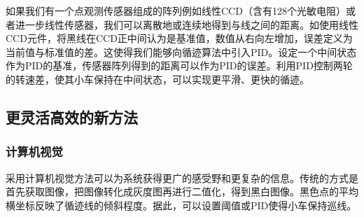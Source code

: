 \documentclass{report}
\begin{document}
如果我们有一个点观测传感器组成的阵列例如线性CCD（含有128个光敏电阻）或者进一步线性传感器，我们可以离散地或连续地得到与线之间的距离。如使用线性CCD元件\cite{CCD}，将黑线在CCD正中间认为是基准值，数值从右向左增加，误差定义为当前值与标准值的差。这使得我们能够向循迹算法中引入PID。设定一个中间状态作为PID的基准，传感器阵列得到的距离可以作为PID的误差。利用PID控制两轮的转速差，使其小车保持在中间状态，可以实现更平滑、更快的循迹。

\subsection{更灵活高效的新方法}
\label{subsec:label}
\subsubsection{计算机视觉\cite{opencv}}
\label{subsec:label}
采用计算机视觉方法可以为系统获得更广的感受野和更复杂的信息。传统的方式是首先获取图像，把图像转化成灰度图再进行二值化，得到黑白图像。黑色点的平均横坐标反映了循迹线的倾斜程度。据此，可以设置阈值或PID使得小车保持巡线。
\end{document}
